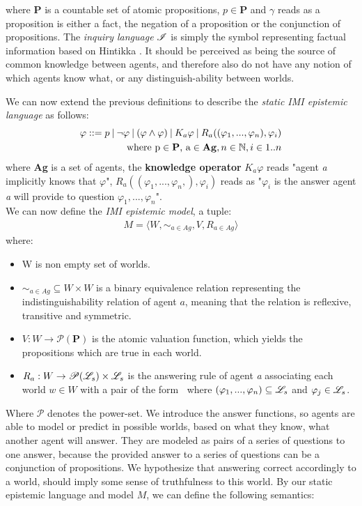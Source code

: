 where \textbf{P} is a countable set of atomic propositions, $p \in\mathbf{P}$ and $\gamma$ reads as a proposition is either a fact, the negation of a proposition or the conjunction of propositions. The \textit{inquiry language} $\mathscr{I}$ is simply the symbol representing factual information based on Hintikka \cite{hintikka88}. It should be perceived as being the source of common knowledge between agents, and therefore also do not have any notion of which agents know what, or any distinguish-ability between worlds.

We can now extend the previous definitions to describe the \textit{static IMI
	epistemic language} \staticlang\: as follows:
\begin{align}
	\begin{split}
		\varphi ::= p \:|\:\neg\varphi\:|\:(\varphi \land \varphi) \:|\: K_a\varphi \:|\: R_a((\varphi_1,...,\varphi_n), \varphi_i) \\ \text{where p} \in \text{\textbf{P}}\text{, a} \in \text{\textbf{Ag}}, n \in \mathbb{N}, i \in 1..n \label{eq:2}
	\end{split}
\end{align}
where \textbf{Ag} is a set of agents, the \textbf{knowledge operator} $K_a\varphi$ reads "agent \textit{a} implicitly knows that $\varphi$",  $R_a((\varphi_1,...,\varphi_n,), \varphi_i)$ reads as "$\varphi_i$ is the answer agent \textit{a} will provide to question $\varphi_1,...,\varphi_n$". \\

We can now define the \textit{IMI epistemic model}, a tuple:
\begin{align}
	M = \langle W, \sim_{a\in Ag}, V, R_{a\in Ag}\rangle \label{eq:3}
\end{align}
where:
\begin{itemize}
	\setlength\itemsep{-0.4em}
	\item W is non empty set of worlds.
	\item $\sim_{a\in Ag} \subseteq W \times W$ is a binary equivalence relation representing the indistinguishability relation of agent $a$, meaning that the relation is reflexive, transitive and symmetric.
	\item $V : W \rightarrow \mathscr{P}(\mathbf{P})$ is the atomic valuation function, which yields the propositions which are true in each world. 
	\item $R_a : W \rightarrow \mathscr{P}(\mathscr{L}_s) \times \mathscr{L}_s$ is the answering rule of agent \textit{a} associating each world $w \in W$ with a pair of the form \aset $\:$ where $(\varphi_1,...,\varphi_n) \subseteq \mathscr{L}_s$ and $\varphi_j \in \mathscr{L}_s$.
\end{itemize}
Where $\mathscr{P}$ denotes the power-set. We introduce the answer functions, so agents are able to model or predict in possible worlds, based on what they know, what another agent will answer. They are modeled as pairs of a series of questions to one answer, because the provided answer to a series of questions can be a conjunction of propositions. We hypothesize that answering correct accordingly to a world, should imply some sense of truthfulness to this world. By our static epistemic language \staticlang\: and model $M$, we can define the following semantics:

